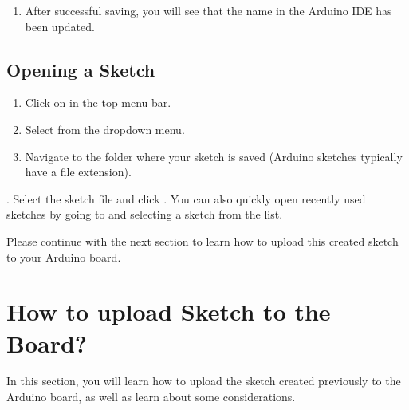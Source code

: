 \documentclass[a4paper,11pt,english]{sphinxmanual}
\begin{document}
\begin{enumerate}
\noindent{}

\item {} 
\sphinxAtStartPar
After successful saving, you will see that the name in the Arduino IDE has been updated.

\noindent{}

\end{enumerate}


\subsection{Opening a Sketch}
\label{\detokenize{Get_Started_with_Arduino/Creating_Opening_Saving_Sketches:opening-a-sketch}}\begin{enumerate}
%
\item {} 
\sphinxAtStartPar
Click on  in the top menu bar.

\item {} 
\sphinxAtStartPar
Select  from the dropdown menu.

\item {} 
\sphinxAtStartPar
Navigate to the folder where your sketch is saved (Arduino sketches typically have a  file extension).

\end{enumerate}

. Select the sketch file and click .
You can also quickly open recently used sketches by going to  and selecting a sketch from the list.

\noindent{}

\sphinxAtStartPar
Please continue with the next section to learn how to upload this created sketch to your Arduino board.

\sphinxstepscope


\section{How to upload Sketch to the Board?}
\label{\detokenize{Get_Started_with_Arduino/How_to_Upload_Sketch:how-to-upload-sketch-to-the-board}}\label{\detokenize{Get_Started_with_Arduino/How_to_Upload_Sketch::doc}}
\sphinxAtStartPar
In this section, you will learn how to upload the sketch created previously to the Arduino board, as well as learn about some considerations.
\end{document}
